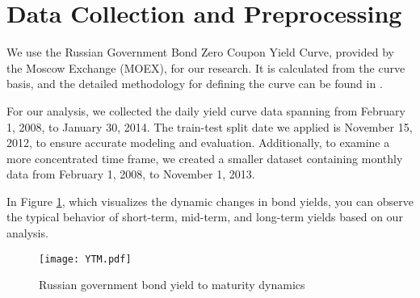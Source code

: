 \section{Data Collection and Preprocessing}
We use the Russian Government Bond Zero Coupon Yield Curve, provided by the Moscow Exchange (MOEX), for our research. It is calculated from the curve basis, and the detailed methodology for defining the curve can be found in \cite{MOEXGCURVEdocs}. 

For our analysis, we collected the daily yield curve data spanning from February 1, 2008, to January 30, 2014. The train-test split date we applied is November 15, 2012, to ensure accurate modeling and evaluation. Additionally, to examine a more concentrated time frame, we created a smaller dataset containing monthly data from February 1, 2008, to November 1, 2013.

In Figure \ref{fig:YTMdynamics}, which visualizes the dynamic changes in bond yields, you can observe the typical behavior of short-term, mid-term, and long-term yields based on our analysis.
\begin{figure}
    \texttt{[image: YTM.pdf]}
    \caption{Russian government bond yield to maturity dynamics}
    \label{fig:YTMdynamics}
\end{figure}